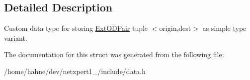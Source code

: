 \subsection{Detailed Description}
Custom data type for storing \hyperlink{structnetxpert_1_1data_1_1ExtODPair}{Ext\+O\+D\+Pair} tuple $<$origin,dest$>$ as simple type variant. 

The documentation for this struct was generated from the following file\+:\begin{DoxyCompactItemize}
\item 
/home/hahne/dev/netxpert1\+\_/include/data.\+h\end{DoxyCompactItemize}
